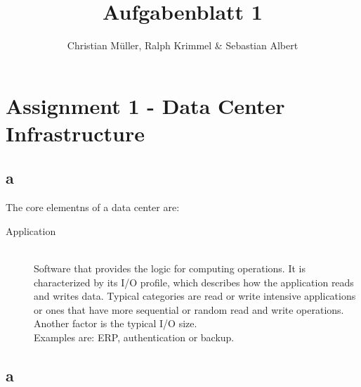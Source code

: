 \documentclass{article}
\begin{document}
\title{Aufgabenblatt 1}
\author{Christian Müller, Ralph Krimmel \& Sebastian Albert }

\maketitle


\section{Assignment 1 - Data Center Infrastructure}

\subsection{a}
	The core elementns of a data center are:\\
	\begin{description}
		\item[Application] \hfill \\
			Software that provides the logic for computing operations.
			It is characterized by its I/O profile,
			which describes how the application reads and writes data.
			Typical categories are read or write intensive applications
			or ones that have more sequential or random read and write operations.
			Another factor is the typical I/O size.\\
			Examples are: ERP, authentication or backup.
	\end{description}





\subsection{a}
\end{document}
